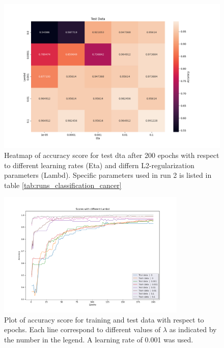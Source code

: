 \begin{figure}[H]
    \centering
    \includegraphics[width=\textwidth]{Figures/PartD/d_heatmap_test_eta_vs_lambda}
    \caption{Heatmap of accuracy score for test dta after 200 epochs with
    respect to different learning rates (Eta) and differn L2-regularization
    parameters (Lambd). Specific parameters used in run 2 is listed in table
    \ref{tab:runs_classification_cancer}       }  
    \label{fig:d_heatmap_test_eta_vs_lambda}  
\end{figure}


            
\begin{figure}[H]
    \centering
    \includegraphics[width=0.8\textwidth]{Figures/PartD/_d_line_different_lambdas.png}
    \caption{Plot of accuracy score for training and test data with respect to
    epochs. Each line correspond to different values of $\lambda $ as indicated
by the number in the legend. A learning rate of 0.001 was used.}  
\label{fig:_d_line_different_lambdas} 
\end{figure}


